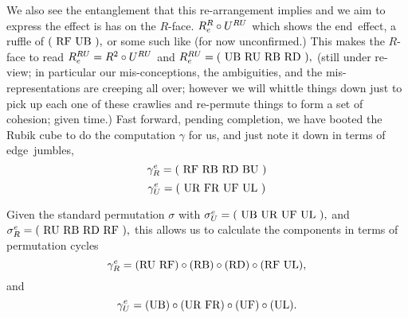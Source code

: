 {We also see the entanglement that this re-arrangement
implies and we aim to express the effect is has on the $R$-face.
$R_e^R\circ U^{RU}$ which shows the end~effect, a ruffle of
$(\hbox{ RF UB }),$ or some such like (for now unconfirmed.)
This makes the $R$-face to read
$R_e^{RU}=R^2\circ U^{RU}$ and
$R_e^{RU}=(\hbox{ UB RU RB RD }),$ (still under re-view;
in particular our mis-conceptions, the ambiguities, and
the mis-representations are creeping all over; however
we will whittle things down just to pick up each one
of these crawlies and re-permute things to form a set
of cohesion; given time.)
\vfil\eject
Fast forward, pending completion, we have booted the Rubik
cube to do the computation $\gamma$ for us, and just note
it down in terms of edge~jumbles,
$$\gamma_R^e=(\hbox{ RF RB RD BU })$$
$$\gamma_U^e=(\hbox{ UR FR UF UL })$$

Given the standard permutation $\sigma$ with
$\sigma_U^e=(\hbox{ UB UR UF UL }),$ and
$\sigma_R^e=(\hbox{ RU RB RD RF }),$
this allows us to calculate the components
in terms of permutation cycles
$$\gamma_R^e=(\hbox{RU RF})\circ(\hbox{RB})\circ(\hbox{RD})\circ(\hbox{RF UL}),$$ and
$$\gamma_U^e=(\hbox{UB})\circ(\hbox{UR FR})\circ(\hbox{UF})\circ(\hbox{UL}).$$
}%
\eject
